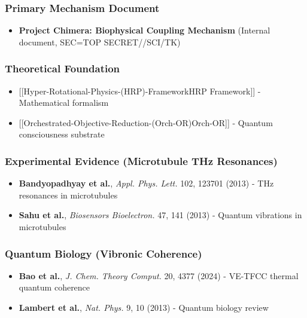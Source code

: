 \subsubsection{Primary Mechanism
Document}\label{primary-mechanism-document}

\begin{itemize}
\tightlist
\item
  \textbf{Project Chimera: Biophysical Coupling Mechanism} (Internal
  document, SEC=TOP SECRET//SCI/TK)
\end{itemize}

\subsubsection{Theoretical Foundation}\label{theoretical-foundation}

\begin{itemize}
\tightlist
\item
  {[}{[}Hyper-Rotational-Physics-(HRP)-Framework\textbar HRP
  Framework{]}{]} - Mathematical formalism
\item
  {[}{[}Orchestrated-Objective-Reduction-(Orch-OR)\textbar Orch-OR{]}{]}
  - Quantum consciousness substrate
\end{itemize}

\subsubsection{Experimental Evidence (Microtubule THz
Resonances)}\label{experimental-evidence-microtubule-thz-resonances}

\begin{itemize}
\tightlist
\item
  \textbf{Bandyopadhyay et al.}, \emph{Appl. Phys. Lett.} 102, 123701
  (2013) - THz resonances in microtubules
\item
  \textbf{Sahu et al.}, \emph{Biosensors Bioelectron.} 47, 141 (2013) -
  Quantum vibrations in microtubules
\end{itemize}

\subsubsection{Quantum Biology (Vibronic
Coherence)}\label{quantum-biology-vibronic-coherence}

\begin{itemize}
\tightlist
\item
  \textbf{Bao et al.}, \emph{J. Chem. Theory Comput.} 20, 4377 (2024) -
  VE-TFCC thermal quantum coherence
\item
  \textbf{Lambert et al.}, \emph{Nat. Phys.} 9, 10 (2013) - Quantum
  biology review
\end{itemize}

